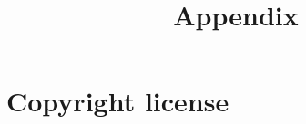 

\title{Appendix}

\usepackage{minted}
\usepackage{geometry}
\geometry{
	margin=0.5in,
	includefoot,
}


\maketitle
\tableofcontents



\section{Copyright license}




